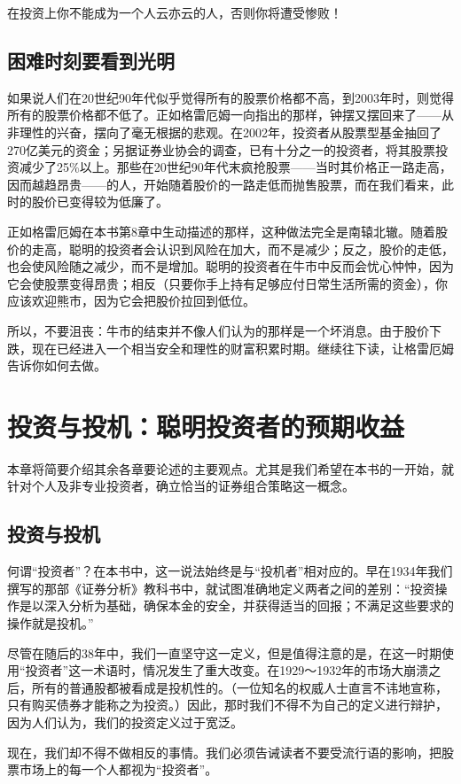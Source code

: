 \documentclass[12pt,oneside]{book}
\begin{document}
在投资上你不能成为一个人云亦云的人，否则你将遭受惨败！



\subsection{困难时刻要看到光明}
如果说人们在20世纪90年代似乎觉得所有的股票价格都不高，到2003年时，则觉得所有的股票价格都不低了。正如格雷厄姆一向指出的那样，钟摆又摆回来了——从非理性的兴奋，摆向了毫无根据的悲观。在2002年，投资者从股票型基金抽回了270亿美元的资金；另据证券业协会的调查，已有十分之一的投资者，将其股票投资减少了25\%以上。那些在20世纪90年代末疯抢股票——当时其价格正一路走高，因而越趋昂贵——的人，开始随着股价的一路走低而抛售股票，而在我们看来，此时的股价已变得较为低廉了。

正如格雷厄姆在本书第8章中生动描述的那样，这种做法完全是南辕北辙。随着股价的走高，聪明的投资者会认识到风险在加大，而不是减少；反之，股价的走低，也会使风险随之减少，而不是增加。聪明的投资者在牛市中反而会忧心忡忡，因为它会使股票变得昂贵；相反（只要你手上持有足够应付日常生活所需的资金），你应该欢迎熊市，因为它会把股价拉回到低位。

所以，不要沮丧：牛市的结束并不像人们认为的那样是一个坏消息。由于股价下跌，现在已经进入一个相当安全和理性的财富积累时期。继续往下读，让格雷厄姆告诉你如何去做。


\section{投资与投机：聪明投资者的预期收益}
本章将简要介绍其余各章要论述的主要观点。尤其是我们希望在本书的一开始，就针对个人及非专业投资者，确立恰当的证券组合策略这一概念。

\subsection{投资与投机}
何谓“投资者”？在本书中，这一说法始终是与“投机者”相对应的。早在1934年我们撰写的那部《证券分析》教科书中，就试图准确地定义两者之间的差别：“投资操作是以深入分析为基础，确保本金的安全，并获得适当的回报；不满足这些要求的操作就是投机。”

尽管在随后的38年中，我们一直坚守这一定义，但是值得注意的是，在这一时期使用“投资者”这一术语时，情况发生了重大改变。在1929～1932年的市场大崩溃之后，所有的普通股都被看成是投机性的。（一位知名的权威人士直言不讳地宣称，只有购买债券才能称之为投资。）因此，那时我们不得不为自己的定义进行辩护，因为人们认为，我们的投资定义过于宽泛。

现在，我们却不得不做相反的事情。我们必须告诫读者不要受流行语的影响，把股票市场上的每一个人都视为“投资者”。
\end{document}
